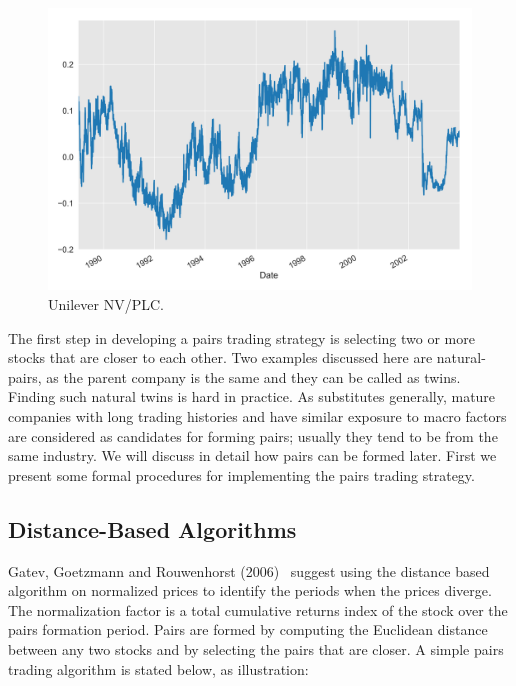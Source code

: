 	\begin{figure}[!ht]
	\centering
	\includegraphics[width=\textwidth]{chapters/chapter_stat_ts/figures/rd_un.png}
	\caption{Unilever NV/PLC. \label{fig:3nvplc}}
	\end{figure}

The first step in developing a pairs trading strategy is selecting two or more stocks that are closer to each other. Two examples discussed here are natural-pairs, as the parent company is the same and they can be called as twins. Finding such natural twins is hard in practice. As substitutes generally, mature companies with long trading histories and have similar exposure to macro factors are considered as candidates for forming pairs; usually they tend to be from the same industry. We will discuss in detail how pairs can be formed later. First we present some formal procedures for implementing the pairs trading strategy.


\subsection{Distance-Based Algorithms\label{subsec:dis_based_alg}}

Gatev, Goetzmann and Rouwenhorst (2006)~\cite{ggr} suggest using the distance based algorithm on normalized prices to identify the periods when the prices diverge. The normalization factor is a total cumulative returns index of the stock over the pairs formation period. Pairs are formed by computing the Euclidean distance between any two stocks and by selecting the pairs that are closer. A simple pairs trading algorithm is stated below, as illustration: \twomedskip

